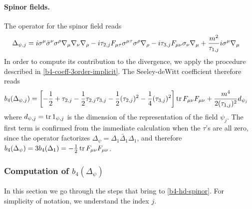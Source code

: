 \paragraph{Spinor fields.} The operator for the spinor field reads
\begin{align}
\Delta_{\psi,j}
	& =
	i \sigma^\mu  \bar\sigma^\nu \sigma^\rho \covD_\mu\covD_\nu  \covD_\rho
	- i \tau_{2,j} F_{ \mu \tau } \sigma^{\mu \tau}  \sigma^\rho \covD_\rho %
	- i \tau_{3,j} F_{ \mu \nu } \sigma_\nu \covD_\mu
	+ \frac{m^2}{\tau_{1,j}} i \sigma^\mu \covD_\mu  
\end{align}
In order to compute its contribution to the divergence, we apply the procedure described in \eqref{b4-coeff-3order-implicit}. The Seeley-deWitt coefficient therefore reads
\begin{equation}\label{b4-hd-spinor}
\begin{split}
b_4(\Delta_{\psi,j})
& =
\left[
-\frac{1}{2}	
+ \tau_{2,j}
- \frac{1}{2} \tau_{2,j} \tau_{3,j}
- \frac{1}{2}	(\tau_{2,j})^2
- \frac{1}{4} (\tau_{3,j})^2
\right]
\operatorname{tr} F_{\mu\nu} F_{\mu\nu}
+ \frac{m^4}{2(\tau_{1,j})^2} d_{\psi_j}
\end{split}
\end{equation}
where \(d_{\psi,j} = \operatorname{tr} 1_{\psi,j}\) is the dimension of the representation of the field $\psi_j.$
The first term is confirmed from the immediate calculation when the $\tau$'s are all zero, since the operator factorizes $ \Delta_\psi = \Delta_1 \bar \Delta_{1} \Delta_1 $, and therefore $b_4(\Delta_\psi) = 3 b_4(\Delta_1) = -\frac{1}{2} \operatorname{tr} F_{\mu\nu} F_{\mu\nu} $.



\subsubsection{Computation of $ b_4(\Delta_\psi)$}

In this section we go through the steps that bring to \eqref{b4-hd-spinor}. For simplicity of notation, we understand the index $j$.

